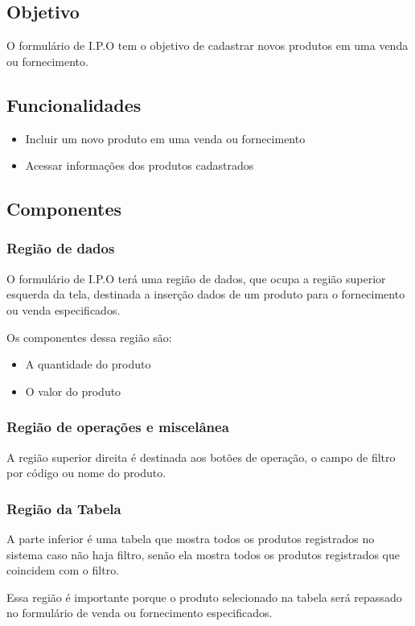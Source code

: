 \documentclass[
	article,			%
	12pt,				%
	oneside,			%
	a4paper,			%
	english,			%
	brazil,				%
	sumario=tradicional
	]{abntex2}
\begin{document}
\subsection{Objetivo}
O formulário de I.P.O tem o objetivo de cadastrar novos produtos em uma venda ou fornecimento.

\subsection{Funcionalidades}
\begin{itemize}
	\item Incluir um novo produto em uma venda ou fornecimento
	\item Acessar informações dos produtos cadastrados
\end{itemize}
\subsection{Componentes}
\subsubsection{Região de dados}
O formulário de I.P.O terá uma região de dados, que ocupa a região superior esquerda da tela, destinada a inserção dados de um produto para o fornecimento ou venda especificados. 

Os componentes dessa região são:
\begin{itemize}\itemsep1.5pt
	\item A quantidade do produto
	\item O valor do produto
\end{itemize}	
\subsubsection{Região de operações e miscelânea}
A região superior direita é destinada aos botões de operação, o campo de filtro por código ou nome do produto.
\subsubsection{Região da Tabela}
A parte inferior é uma tabela que mostra todos os produtos registrados no sistema caso não haja filtro, senão ela mostra todos os produtos registrados que coincidem com o filtro.

Essa região é importante porque o produto selecionado na tabela será repassado no formulário de venda ou fornecimento especificados.
\end{document}
